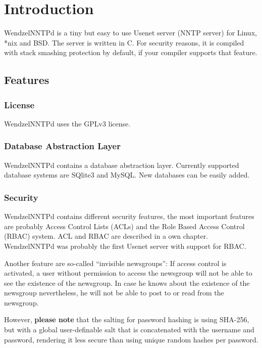 \chapter{Introduction}

WendzelNNTPd is a tiny but easy to use Usenet server (NNTP server) for Linux, *nix and BSD. The server is written in C. For security reasons, it is compiled with stack smashing protection by default, if your compiler supports that feature.

\section{Features}

\subsection{License}

WendzelNNTPd uses the GPLv3 license.

\subsection{Database Abstraction Layer}

WendzelNNTPd contains a database abstraction layer. Currently supported database systems are SQlite3 and MySQL. New databases can be easily added.

\subsection{Security}

WendzelNNTPd contains different security features, the most important features are probably Access Control Lists (ACLs) and the Role Based Access Control (RBAC) system. ACL and RBAC are described in a own chapter. WendzelNNTPd was probably the first Usenet server with support for RBAC.

Another feature are so-called ``invisible newsgroups'': If access control is activated, a user without permission to access the newsgroup will not be able to see the existence of the newsgroup. In case he knows about the existence of the newsgroup nevertheless, he will not be able to post to or read from the newsgroup.

However, \textbf{please note} that the salting for password hashing is using SHA-256, but with a global user-definable salt that is concatenated with the username and password, rendering it less secure than using unique random hashes per password.

